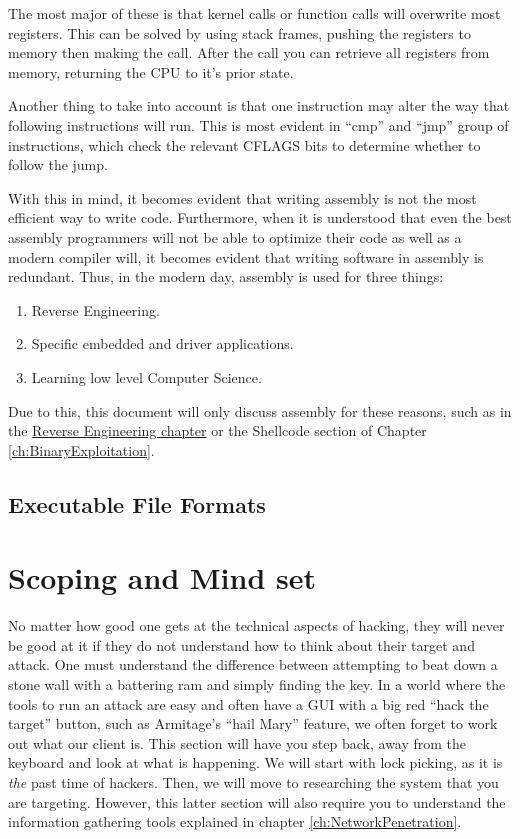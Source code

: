 \documentclass[a4paper,11pt]{report}
\begin{document}
			The most major of these is that kernel calls or function calls will overwrite most registers. 
			This can be solved by using stack frames, pushing the registers to memory then making the call. 
			After the call you can retrieve all registers from memory, returning the CPU to it's prior state. 

			Another thing to take into account is that one instruction may alter the way that following instructions will run. 
			This is most evident in ``cmp'' and ``jmp'' group of instructions, which check the relevant CFLAGS bits to determine whether to follow the jump. 

			With this in mind, it becomes evident that writing assembly is not the most efficient way to write code. 
			Furthermore, when it is understood that even the best assembly programmers will not be able to optimize their code as well as a modern compiler will, it becomes evident that writing software in assembly is redundant. 
			Thus, in the modern day, assembly is used for three things:
			\begin{enumerate}
				\item Reverse Engineering.
				\item Specific embedded and driver applications.
				\item Learning low level Computer Science. 
			\end{enumerate}
			
			Due to this, this document will only discuss assembly for these reasons, such as in the \hyperref[ch:ReverseEngineering]{Reverse Engineering chapter} or the Shellcode section of Chapter \ref{ch:BinaryExploitation}.
			
	\section{Executable File Formats}
\chapter{Scoping and Mind set}
	\label{ch:ScopingMindset}
		No matter how good one gets at the technical aspects of hacking, they will never be good at it if they do not understand how to think about their target and attack. 
		One must understand the difference between attempting to beat down a stone wall with a battering ram and simply finding the key. 
		In a world where the tools to run an attack are easy and often have a GUI with a big red ``hack the target'' button, such as Armitage's ``hail Mary'' feature, 
		we often forget to work out what our client is. 
		This section will have you step back, away from the keyboard and look at what is happening. 
		We will start with lock picking, as it is \emph{the} past time of hackers. 
		Then, we will move to researching the system that you are targeting. 
		However, this latter section will also require you to understand the information gathering tools explained in chapter \ref{ch:NetworkPenetration}.
\end{document}
